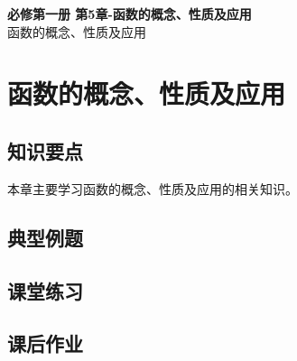 \documentclass[12pt,a4paper]{article}
\begin{document}
\begin{center}
\LARGE\textbf{必修第一册 第5章-函数的概念、性质及应用} \\[0.5em]
\large 函数的概念、性质及应用
\end{center}

\tableofcontents
\newpage

\section{函数的概念、性质及应用}

\subsection{知识要点}
本章主要学习函数的概念、性质及应用的相关知识。

\subsection{典型例题}

\subsection{课堂练习}

\subsection{课后作业}
\end{document}
